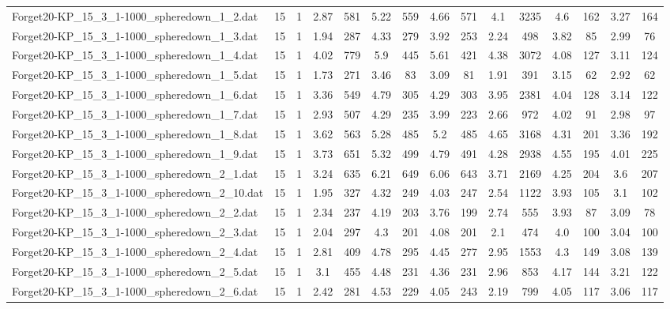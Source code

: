 \begin{table}[!ht]
{\begin{tabular}{lcccccccccccccc}
Forget20-KP\_15\_3\_1-1000\_spheredown\_1\_2.dat & 15 & 1 & 2.87 & 581 & 5.22 & 559 & 4.66 & 571 & 4.1 & 3235 & 4.6 & 162 & 3.27 & 164 \\
Forget20-KP\_15\_3\_1-1000\_spheredown\_1\_3.dat & 15 & 1 & 1.94 & 287 & 4.33 & 279 & 3.92 & 253 & 2.24 & 498 & 3.82 & 85 & 2.99 & 76 \\
Forget20-KP\_15\_3\_1-1000\_spheredown\_1\_4.dat & 15 & 1 & 4.02 & 779 & 5.9 & 445 & 5.61 & 421 & 4.38 & 3072 & 4.08 & 127 & 3.11 & 124 \\
Forget20-KP\_15\_3\_1-1000\_spheredown\_1\_5.dat & 15 & 1 & 1.73 & 271 & 3.46 & 83 & 3.09 & 81 & 1.91 & 391 & 3.15 & 62 & 2.92 & 62 \\
Forget20-KP\_15\_3\_1-1000\_spheredown\_1\_6.dat & 15 & 1 & 3.36 & 549 & 4.79 & 305 & 4.29 & 303 & 3.95 & 2381 & 4.04 & 128 & 3.14 & 122 \\
Forget20-KP\_15\_3\_1-1000\_spheredown\_1\_7.dat & 15 & 1 & 2.93 & 507 & 4.29 & 235 & 3.99 & 223 & 2.66 & 972 & 4.02 & 91 & 2.98 & 97 \\
Forget20-KP\_15\_3\_1-1000\_spheredown\_1\_8.dat & 15 & 1 & 3.62 & 563 & 5.28 & 485 & 5.2 & 485 & 4.65 & 3168 & 4.31 & 201 & 3.36 & 192 \\
Forget20-KP\_15\_3\_1-1000\_spheredown\_1\_9.dat & 15 & 1 & 3.73 & 651 & 5.32 & 499 & 4.79 & 491 & 4.28 & 2938 & 4.55 & 195 & 4.01 & 225 \\
Forget20-KP\_15\_3\_1-1000\_spheredown\_2\_1.dat & 15 & 1 & 3.24 & 635 & 6.21 & 649 & 6.06 & 643 & 3.71 & 2169 & 4.25 & 204 & 3.6 & 207 \\
Forget20-KP\_15\_3\_1-1000\_spheredown\_2\_10.dat & 15 & 1 & 1.95 & 327 & 4.32 & 249 & 4.03 & 247 & 2.54 & 1122 & 3.93 & 105 & 3.1 & 102 \\
Forget20-KP\_15\_3\_1-1000\_spheredown\_2\_2.dat & 15 & 1 & 2.34 & 237 & 4.19 & 203 & 3.76 & 199 & 2.74 & 555 & 3.93 & 87 & 3.09 & 78 \\
Forget20-KP\_15\_3\_1-1000\_spheredown\_2\_3.dat & 15 & 1 & 2.04 & 297 & 4.3 & 201 & 4.08 & 201 & 2.1 & 474 & 4.0 & 100 & 3.04 & 100 \\
Forget20-KP\_15\_3\_1-1000\_spheredown\_2\_4.dat & 15 & 1 & 2.81 & 409 & 4.78 & 295 & 4.45 & 277 & 2.95 & 1553 & 4.3 & 149 & 3.08 & 139 \\
Forget20-KP\_15\_3\_1-1000\_spheredown\_2\_5.dat & 15 & 1 & 3.1 & 455 & 4.48 & 231 & 4.36 & 231 & 2.96 & 853 & 4.17 & 144 & 3.21 & 122 \\
Forget20-KP\_15\_3\_1-1000\_spheredown\_2\_6.dat & 15 & 1 & 2.42 & 281 & 4.53 & 229 & 4.05 & 243 & 2.19 & 799 & 4.05 & 117 & 3.06 & 117 \\

\end{tabular}}
\end{table}
